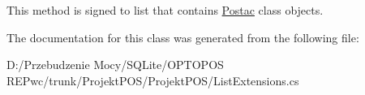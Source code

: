 This method is signed to list that contains \hyperlink{class_projekt_p_o_s_1_1_postac}{Postac} class objects. 



The documentation for this class was generated from the following file\+:\begin{DoxyCompactItemize}
\item 
D\+:/\+Przebudzenie Mocy/\+S\+Q\+Lite/\+O\+P\+T\+O\+P\+O\+S R\+E\+Pwc/trunk/\+Projekt\+P\+O\+S/\+Projekt\+P\+O\+S/List\+Extensions.\+cs\end{DoxyCompactItemize}
